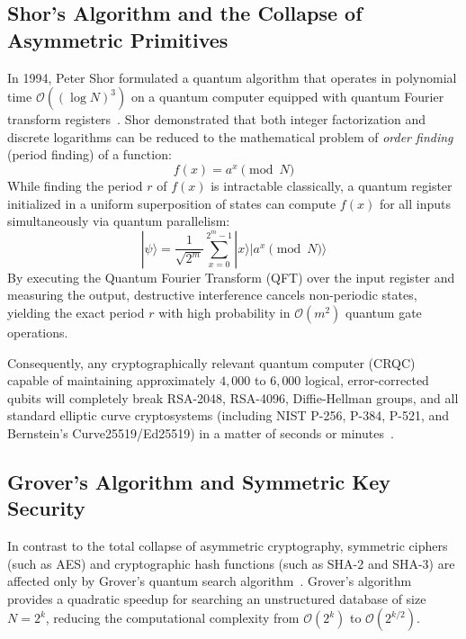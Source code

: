 \subsection{Shor's Algorithm and the Collapse of Asymmetric Primitives}
In 1994, Peter Shor formulated a quantum algorithm that operates in polynomial time $\mathcal{O}((\log N)^3)$ on a quantum computer equipped with quantum Fourier transform registers~\cite{shor1994algorithms}. Shor demonstrated that both integer factorization and discrete logarithms can be reduced to the mathematical problem of \textit{order finding} (period finding) of a function:
\begin{equation}
f(x) = a^x \pmod N
\end{equation}
While finding the period $r$ of $f(x)$ is intractable classically, a quantum register initialized in a uniform superposition of states can compute $f(x)$ for all inputs simultaneously via quantum parallelism:
\begin{equation}
|\psi\rangle = \frac{1}{\sqrt{2^m}} \sum_{x=0}^{2^m-1} |x\rangle |a^x \pmod N\rangle
\end{equation}
By executing the Quantum Fourier Transform (QFT) over the input register and measuring the output, destructive interference cancels non-periodic states, yielding the exact period $r$ with high probability in $\mathcal{O}(m^2)$ quantum gate operations.

Consequently, any cryptographically relevant quantum computer (CRQC) capable of maintaining approximately $4,000$ to $6,000$ logical, error-corrected qubits will completely break RSA-2048, RSA-4096, Diffie-Hellman groups, and all standard elliptic curve cryptosystems (including NIST P-256, P-384, P-521, and Bernstein's Curve25519/Ed25519) in a matter of seconds or minutes~\cite{bernstein2017postquantum}.

\subsection{Grover's Algorithm and Symmetric Key Security}
In contrast to the total collapse of asymmetric cryptography, symmetric ciphers (such as AES) and cryptographic hash functions (such as SHA-2 and SHA-3) are affected only by Grover's quantum search algorithm~\cite{grover1996fast}. Grover's algorithm provides a quadratic speedup for searching an unstructured database of size $N = 2^k$, reducing the computational complexity from $\mathcal{O}(2^k)$ to $\mathcal{O}(2^{k/2})$.

